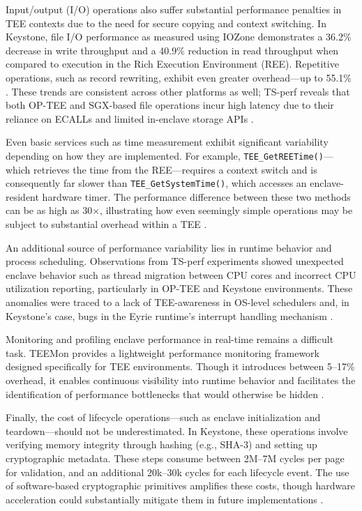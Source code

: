 Input/output (I/O) operations also suffer substantial performance penalties in TEE contexts due to the need for secure copying and context switching. In Keystone, file I/O performance as measured using IOZone demonstrates a 36.2\% decrease in write throughput and a 40.9\% reduction in read throughput when compared to execution in the Rich Execution Environment (REE). Repetitive operations, such as record rewriting, exhibit even greater overhead—up to 55.1\% \cite{dayeol2019keystone}. These trends are consistent across other platforms as well; TS-perf reveals that both OP-TEE and SGX-based file operations incur high latency due to their reliance on ECALLs and limited in-enclave storage APIs \cite{Suzaki2021}.

Even basic services such as time measurement exhibit significant variability depending on how they are implemented. For example, \texttt{TEE\_GetREETime()}—which retrieves the time from the REE—requires a context switch and is consequently far slower than \texttt{TEE\_GetSystemTime()}, which accesses an enclave-resident hardware timer. The performance difference between these two methods can be as high as 30×, illustrating how even seemingly simple operations may be subject to substantial overhead within a TEE \cite{Suzaki2021}.

An additional source of performance variability lies in runtime behavior and process scheduling. Observations from TS-perf experiments showed unexpected enclave behavior such as thread migration between CPU cores and incorrect CPU utilization reporting, particularly in OP-TEE and Keystone environments. These anomalies were traced to a lack of TEE-awareness in OS-level schedulers and, in Keystone's case, bugs in the Eyrie runtime's interrupt handling mechanism \cite{Suzaki2021}.

Monitoring and profiling enclave performance in real-time remains a difficult task. TEEMon provides a lightweight performance monitoring framework designed specifically for TEE environments. Though it introduces between 5–17\% overhead, it enables continuous visibility into runtime behavior and facilitates the identification of performance bottlenecks that would otherwise be hidden \cite{krahn2020teemon}.

Finally, the cost of lifecycle operations—such as enclave initialization and teardown—should not be underestimated. In Keystone, these operations involve verifying memory integrity through hashing (e.g., SHA-3) and setting up cryptographic metadata. These steps consume between 2M–7M cycles per page for validation, and an additional 20k–30k cycles for each lifecycle event. The use of software-based cryptographic primitives amplifies these costs, though hardware acceleration could substantially mitigate them in future implementations \cite{dayeol2019keystone}.

